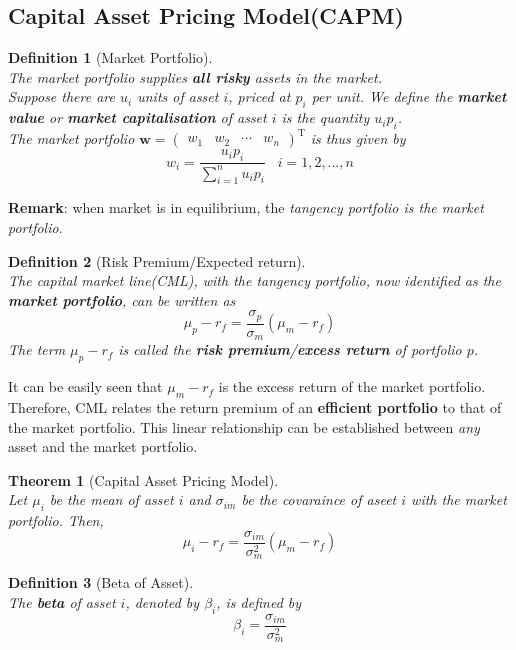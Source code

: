 \documentclass[12pt]{article}
\newtheorem{definition}{Definition}[section]
\newtheorem{theorem}{Theorem}[section]
\theoremstyle{definition}
\begin{document}
\subsection{Capital Asset Pricing Model(CAPM)}
\begin{definition}[Market Portfolio]
\hfill\\\normalfont The market portfolio supplies \textbf{all risky} assets in the market. \\
Suppose there are $u_i$ units of asset $i$, priced at $p_i$ per unit. We define the \textbf{market value} or \textbf{market capitalisation} of asset $i$ is the quantity $u_ip_i$.\\The market portfolio $\mathbf{w}=\begin{pmatrix}w_1&w_2&\cdots&w_n\end{pmatrix}^\text{T}$ is thus given by
\[
w_i=\frac{u_ip_i}{\sum_{i=1}^n u_ip_i}\;\;\;i=1,2,\ldots, n
\]
\end{definition}
\textbf{Remark}: when market is in equilibrium, the \textit{tangency portfolio is the market portfolio}.
\begin{definition}[Risk Premium/Expected return]
\hfill\\\normalfont The capital market line(CML), with the tangency portfolio, now identified as the \textbf{market portfolio}, can be written as
\[
\mu_p-r_f=\frac{\sigma_p}{\sigma_m}(\mu_m-r_f)
\]
The term $\mu_p-r_f$ is called the \textbf{risk premium}/\textbf{excess return} of portfolio $p$.
\end{definition}
It can be easily seen that $\mu_m-r_f$ is the excess return of the market portfolio.\\
Therefore, CML relates the return premium of an \textbf{efficient portfolio} to that of the market portfolio. This linear relationship can be established between \textit{any} asset and the market portfolio.
\begin{theorem}[Capital Asset Pricing Model]
\hfill\\\normalfont Let $\mu_i$ be the mean of asset $i$ and $\sigma_{im}$ be the covaraince of aseet $i$ with the market portfolio. Then,
\[
\mu_i-r_f=\frac{\sigma_{im}}{\sigma_m^2}(\mu_m-r_f)
\]
\end{theorem}
\begin{definition}[Beta of Asset]
\hfill\\\normalfont The \textbf{beta} of asset $i$, denoted by $\beta_i$, is defined by
\[
\beta_i=\frac{\sigma_{im}}{\sigma_m^2}
\]
\end{definition}
\end{document}
